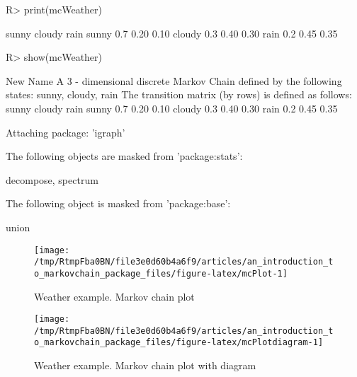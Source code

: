 \documentclass[
  nojss]{jss}
\begin{document}
\begin{CodeChunk}

\begin{CodeInput}
R> print(mcWeather)
\end{CodeInput}

\begin{CodeOutput}
       sunny cloudy rain
sunny    0.7   0.20 0.10
cloudy   0.3   0.40 0.30
rain     0.2   0.45 0.35
\end{CodeOutput}

\begin{CodeInput}
R> show(mcWeather)
\end{CodeInput}

\begin{CodeOutput}
New Name 
 A  3 - dimensional discrete Markov Chain defined by the following states: 
 sunny, cloudy, rain 
 The transition matrix  (by rows)  is defined as follows: 
       sunny cloudy rain
sunny    0.7   0.20 0.10
cloudy   0.3   0.40 0.30
rain     0.2   0.45 0.35
\end{CodeOutput}
\end{CodeChunk}

\begin{CodeChunk}

\begin{CodeOutput}

Attaching package: 'igraph'
\end{CodeOutput}

\begin{CodeOutput}
The following objects are masked from 'package:stats':

    decompose, spectrum
\end{CodeOutput}

\begin{CodeOutput}
The following object is masked from 'package:base':

    union
\end{CodeOutput}
\begin{figure}

{\centering \texttt{[image: /tmp/RtmpFba0BN/file3e0d60b4a6f9/articles/an\_introduction\_to\_markovchain\_package\_files/figure-latex/mcPlot-1]} 

}

\caption[Weather example]{Weather example. Markov chain plot}\label{fig:mcPlot}
\end{figure}
\end{CodeChunk}

\begin{CodeChunk}
\begin{figure}

{\centering \texttt{[image: /tmp/RtmpFba0BN/file3e0d60b4a6f9/articles/an\_introduction\_to\_markovchain\_package\_files/figure-latex/mcPlotdiagram-1]} 

}

\caption[Weather example]{Weather example. Markov chain plot with diagram}\label{fig:mcPlotdiagram}
\end{figure}
\end{CodeChunk}
\end{document}
